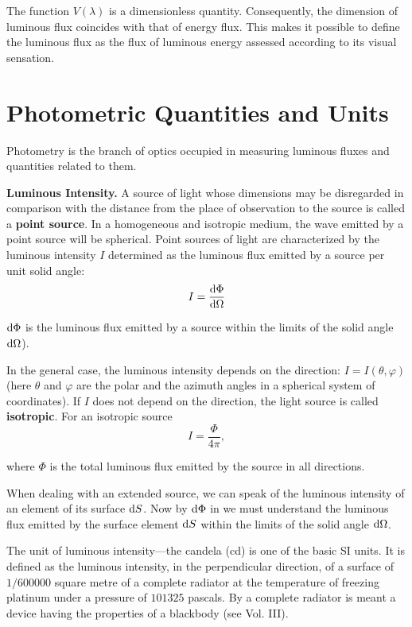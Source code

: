 The function $V(\lambda)$ is a dimensionless quantity.
Consequently, the dimension of luminous flux coincides with that of energy flux.
This makes it possible to define the luminous flux as the flux of luminous energy assessed according to its visual sensation.

\section{Photometric Quantities and Units}\label{sec:16_5}

Photometry is the branch of optics occupied in measuring luminous fluxes and quantities related to them.

\textbf{Luminous Intensity.}
A source of light whose dimensions may be disregarded in comparison with the distance from the place of observation to the source is called a \textbf{point source}.
In a homogeneous and isotropic medium, the wave emitted by a point source will be spherical.
Point sources of light are characterized by the luminous intensity $I$ determined as the luminous flux emitted by a source per unit solid angle:
\begin{equation}\label{eq:16_40}
    I = \dfrac{\mathrm{d}\Phi}{\mathrm{d}\Omega}
\end{equation}

\noindent
$\mathrm{d}\Phi$ is the luminous flux emitted by a source within the limits of the solid angle $\mathrm{d}\Omega$).

In the general case, the luminous intensity depends on the direction: $I=I(\theta,\varphi)$ (here $\theta$ and $\varphi$ are the polar and the azimuth angles in a spherical system of coordinates).
If $I$ does not depend on the direction, the light source is called \textbf{isotropic}.
For an isotropic source
\begin{equation}\label{eq:16_41}
    I = \frac{\Phi}{4\pi},
\end{equation}

\noindent
where $\Phi$ is the total luminous flux emitted by the source in all directions.

When dealing with an extended source, we can speak of the luminous intensity of an element of its surface $\mathrm{d} S$.
Now by $\mathrm{d}\Phi$ in  we must understand the luminous flux emitted by the surface
element $\mathrm{d} S$ within the limits of the solid angle $\mathrm{d}\Omega$.

The unit of luminous intensity---the candela (\si{\candela}) is one of the basic SI units.
It is defined as the luminous intensity, in the perpendicular direction, of a surface of $1/600000$ square metre of a complete radiator at the temperature of freezing platinum under a pressure of
$101325$ pascals.
By a complete radiator is meant a device having the properties of a blackbody (see Vol. III).

